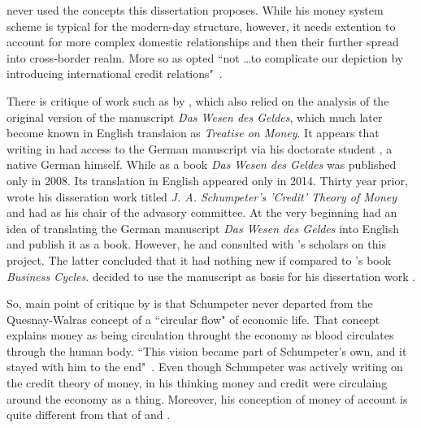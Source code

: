 \citeauthor{schumpeter2014} never used the concepts this dissertation proposes. While his money system scheme is typical for the modern-day structure, however, it needs extention to account for more complex domestic relationships and then their further spread into cross-border realm. More so as \citeauthor{schumpeter2014} opted ``not \dots to complicate our depiction by introducing international credit relations"~\citep[p.~184]{schumpeter2014}.

There is critique of \citeauthor{schumpeter2014} work such as by \cite{earley1994}, which also relied on the analysis of the original version of the manuscript \textit{Das Wesen des Geldes}, which much later become known in English translaion as \textit{Treatise on Money}. It appears that \citeauthor{earley1994} writing in \citeyear{earley1994} had access to the German manuscript via his doctorate student \citeauthor{reclam1984}, a native German himself. While as a book \textit{Das Wesen des Geldes} was published only in 2008. Its translation in English appeared only in 2014. Thirty year prior, \citeauthor{reclam1984} wrote his disseration work titled \textit{J. A. Schumpeter's 'Credit' Theory of Money} and had \citeauthor{earley1994} as his chair of the advasory committee. At the very beginning \citeauthor{reclam1984} had an idea of translating the German manuscript \textit{Das Wesen des Geldes} into English and publish it as a book. However, he and \citeauthor{earley1994} consulted with \citeauthor{schumpeter2014}'s scholars on this project. The latter concluded that it had nothing new if compared to \citeauthor{schumpeter1939_1}'s book \textit{Business Cycles}. \citeauthor{reclam1984} decided to use the manuscript as basis for his dissertation work \citep{reclam1984}.

So, main point of critique by \cite{earley1994} is that Schumpeter never departed from the Quesnay-Walras concept of a ``circular flow" of economic life. That concept explains money as being circulation throught the economy as blood circulates through the human body. ``This vision became part of Schumpeter's own, and it stayed with him to the end"~\cite[p.~344]{earley1994}. Even though Schumpeter was actively writing on the credit theory of money, in his thinking money and credit were circulaing around the economy as a thing. Moreover, his conception of money of account is quite different from that of \citeauthor{keynes1930a} and \citeauthor{innes1913}. 

